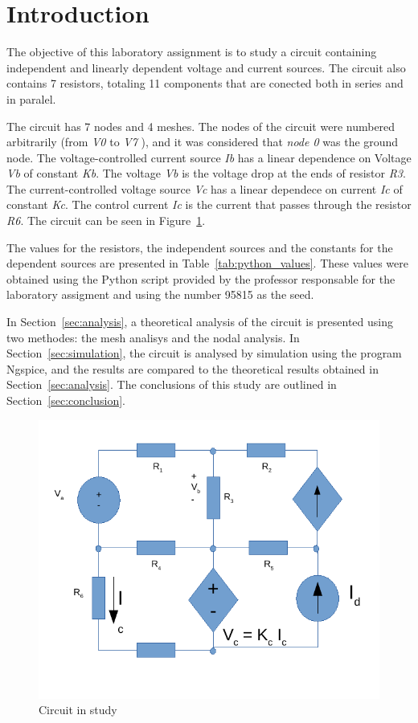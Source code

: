 \section{Introduction}
\label{sec:introduction}

\par The objective of this laboratory assignment is to study a circuit containing independent and 
linearly dependent voltage and current sources. The circuit also contains 7 resistors, totaling 11 components that are conected both in series and in paralel.\par
The circuit has 7 nodes and 4 meshes. The nodes of the circuit were numbered arbitrarily (from {\it V0}  to  {\it V7} ), and it was considered that {\it node 0} was the ground node. The voltage-controlled current source {\it Ib} has a linear dependence on Voltage {\it Vb} of constant {\it Kb}. The voltage {\it Vb} is the voltage drop at the ends of resistor {\it R3}. The current-controlled voltage source {\it Vc} has a linear dependece on current {\it Ic} of constant {\it Kc}. The control current {\it Ic} is the current that passes through the resistor {\it R6}.
The circuit can be seen in Figure~\ref{fig:circuit_t1}.\par
The values for the resistors, the independent sources and the  constants for the dependent 
sources are presented in Table~\ref{tab:python_values}. These values were obtained using the
Python script provided by the professor responsable for the laboratory assigment
and using the number 95815 as the seed.\par

In Section~\ref{sec:analysis}, a theoretical analysis of the circuit is
presented using two methodes: the mesh analisys and the nodal analysis. In Section~\ref{sec:simulation}, the circuit is analysed by
simulation using the program Ngspice, and the results are compared to the theoretical results obtained in
Section~\ref{sec:analysis}. The conclusions of this study are outlined in
Section~\ref{sec:conclusion}.

\begin{figure}[h] \centering
\includegraphics[width=0.9\linewidth]{circuit_t1.pdf}
\caption{Circuit in study}
\label{fig:circuit_t1}
\end{figure}


